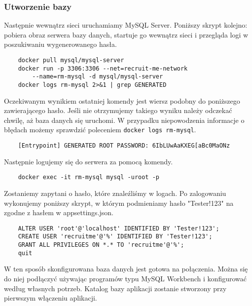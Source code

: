 \documentclass{article}
\begin{document}
\subsubsection{Utworzenie bazy}
Następnie wewnątrz sieci uruchamiamy MySQL Server. Poniższy skrypt kolejno: pobiera obraz serwera bazy danych, startuje go wewnątrz sieci i przegląda logi w poszukiwaniu wygenerowanego hasła.
\begin{verbatim}
    docker pull mysql/mysql-server
    docker run -p 3306:3306 --net=recruit-me-network 
        --name=rm-mysql -d mysql/mysql-server
    docker logs rm-mysql 2>&1 | grep GENERATED
\end{verbatim}
Oczekiwanym wynikiem ostatniej komendy jest wiersz podobny do poniższego zawierającego hasło. Jeśli nie otrzymujemy takiego wyniku należy odczekać chwilę, aż baza danych się uruchomi. W przypadku niepowodzenia informacje o błędach możemy sprawdzić poleceniem \verb"docker logs rm-mysql".
\begin{verbatim}
    [Entrypoint] GENERATED ROOT PASSWORD: 6IbLUwAaKXEG[aBc0MaONz
\end{verbatim}
Następnie logujemy się do serwera za pomocą komendy.
\begin{verbatim}
    docker exec -it rm-mysql mysql -uroot -p
\end{verbatim}
Zostaniemy zapytani o hasło, które znaleźliśmy w logach. Po zalogowaniu wykonujemy poniższy skrypt, w którym podmieniamy hasło "Tester!123" na zgodne z hasłem w appsettings.json.
\begin{verbatim}
    ALTER USER 'root'@'localhost' IDENTIFIED BY 'Tester!123';
    CREATE USER 'recruitme'@'%' IDENTIFIED BY 'Tester!123';
    GRANT ALL PRIVILEGES ON *.* TO 'recruitme'@'%';
    quit
\end{verbatim}
W ten sposób skonfigurowana baza danych jest gotowa na połączenia. Można się do niej podłączyć używając programów typu MySQL Workbench i konfigurować według własnych potrzeb. Katalog bazy aplikacji zostanie stworzony przy pierwszym włączeniu aplikacji.
\end{document}
